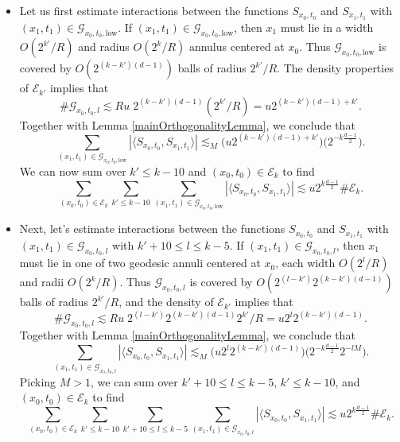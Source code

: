 \begin{itemize}
    \item Let us first estimate interactions between the functions ${S\!}_{x_0,t_0}$ and ${S\!}_{x_1,t_1}$ with $(x_1,t_1) \in \mathcal{G}_{x_0,t_0,\text{low}}$. If $(x_1,t_1) \in \mathcal{G}_{x_0,t_0,\text{low}}$, then $x_1$ must lie in a width $O(2^{k'} / R)$ and radius $O(2^k / R)$ annulus centered at $x_0$. Thus $\mathcal{G}_{x_0,t_0,\text{low}}$ is covered by $O( 2^{(k-k')(d-1)} )$ balls of radius $2^{k'} / R$. The density properties of $\mathcal{E}_{k'}$ implies that
    \[ \# \mathcal{G}_{x_0,t_0,l} \lesssim Ru\; 2^{(k-k')(d-1)} (2^{k'} / R) = u 2^{(k-k')(d-1) + k'}. \]
    Together with Lemma \ref{mainOrthogonalityLemma}, we conclude that
    \[ \sum_{(x_1,t_1) \in \mathcal{G}_{x_0,t_0,\text{low}}} |\langle {S\!}_{x_0,t_0}, {S\!}_{x_1,t_1} \rangle| \lesssim_M \Big( u 2^{(k-k')(d-1) + k'} \Big) \Big( 2^{-k \frac{d-1}{2}} \Big). \]
    We can now sum over $k' \leq k - 10$ and $(x_0,t_0) \in \mathcal{E}_k$ to find
    \[ \sum_{(x_0,t_0) \in \mathcal{E}_k} \sum_{k' \leq k - 10} \sum_{(x_1,t_1) \in \mathcal{G}_{x_0,t_0,\text{low}}} |\langle {S\!}_{x_0,t_0}, {S\!}_{x_1,t_1} \rangle| \lesssim u 2^{k \frac{d-1}{2}} \# \mathcal{E}_k. \]

    \item Next, let's estimate interactions between the functions ${S\!}_{x_0,t_0}$ and ${S\!}_{x_1,t_1}$ with $(x_1,t_1) \in \mathcal{G}_{x_0,t_0,l}$ with $k' + 10 \leq l \leq k - 5$. If $(x_1,t_1) \in \mathcal{G}_{x_0,t_0,l}$, then $x_1$ must lie in one of two geodesic annuli centered at $x_0$, each width $O(2^l/R)$ and radii $O(2^k / R)$. Thus $\mathcal{G}_{x_0,t_0,l}$ is covered by $O( 2^{(l-k')} 2^{(k-k')(d-1)} )$ balls of radius $2^{k'} / R$, and the density of $\mathcal{E}_{k'}$ implies that
    \[ \# \mathcal{G}_{x_0,t_0,l} \lesssim Ru\; 2^{(l-k')} 2^{(k-k')(d-1)} 2^{k'} / R = u 2^{l} 2^{(k-k')(d-1)}. \]
    Together with Lemma \ref{mainOrthogonalityLemma}, we conclude that
    \[ \sum_{(x_1,t_1) \in \mathcal{G}_{x_0,t_0,l}} |\langle {S\!}_{x_0,t_0}, {S\!}_{x_1,t_1} \rangle| \lesssim_M \Big( u 2^{l} 2^{(k-k')(d-1)} \Big) \Big( 2^{-k \frac{d-1}{2}} 2^{-lM} \Big). \]
    Picking $M > 1$, we can sum over $k' + 10 \leq l \leq k - 5$, $k' \leq k - 10$, and $(x_0,t_0) \in \mathcal{E}_k$ to find
    \[ \sum_{(x_0,t_0) \in \mathcal{E}_k} \sum_{k' \leq k - 10} \sum_{k'+10 \leq l \leq k - 5} \sum_{(x_1,t_1) \in \mathcal{G}_{x_0,t_0,l}} |\langle {S\!}_{x_0,t_0}, {S\!}_{x_1,t_1} \rangle| \lesssim u 2^{k \frac{d-1}{2}} \# \mathcal{E}_k. \]


\end{itemize}
